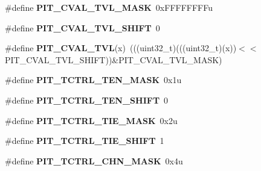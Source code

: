 \begin{DoxyCompactItemize}
\item 
\#define {\bfseries P\+I\+T\+\_\+\+C\+V\+A\+L\+\_\+\+T\+V\+L\+\_\+\+M\+A\+SK}~0x\+F\+F\+F\+F\+F\+F\+F\+Fu\hypertarget{group__PIT__Register__Masks_ga2810b877338372cb9b9d944b206c08d3}{}\label{group__PIT__Register__Masks_ga2810b877338372cb9b9d944b206c08d3}

\item 
\#define {\bfseries P\+I\+T\+\_\+\+C\+V\+A\+L\+\_\+\+T\+V\+L\+\_\+\+S\+H\+I\+FT}~0\hypertarget{group__PIT__Register__Masks_ga28753a1a45034ccd34e052faa3e02ff0}{}\label{group__PIT__Register__Masks_ga28753a1a45034ccd34e052faa3e02ff0}

\item 
\#define {\bfseries P\+I\+T\+\_\+\+C\+V\+A\+L\+\_\+\+T\+VL}(x)~(((uint32\+\_\+t)(((uint32\+\_\+t)(x))$<$$<$P\+I\+T\+\_\+\+C\+V\+A\+L\+\_\+\+T\+V\+L\+\_\+\+S\+H\+I\+FT))\&P\+I\+T\+\_\+\+C\+V\+A\+L\+\_\+\+T\+V\+L\+\_\+\+M\+A\+SK)\hypertarget{group__PIT__Register__Masks_ga00291ae8d045c0b0f199d8950c7e453a}{}\label{group__PIT__Register__Masks_ga00291ae8d045c0b0f199d8950c7e453a}

\item 
\#define {\bfseries P\+I\+T\+\_\+\+T\+C\+T\+R\+L\+\_\+\+T\+E\+N\+\_\+\+M\+A\+SK}~0x1u\hypertarget{group__PIT__Register__Masks_ga1099670711f996f5fa84e33bbfe794b2}{}\label{group__PIT__Register__Masks_ga1099670711f996f5fa84e33bbfe794b2}

\item 
\#define {\bfseries P\+I\+T\+\_\+\+T\+C\+T\+R\+L\+\_\+\+T\+E\+N\+\_\+\+S\+H\+I\+FT}~0\hypertarget{group__PIT__Register__Masks_ga0080137ff0378087f08cc12fd10b3e1f}{}\label{group__PIT__Register__Masks_ga0080137ff0378087f08cc12fd10b3e1f}

\item 
\#define {\bfseries P\+I\+T\+\_\+\+T\+C\+T\+R\+L\+\_\+\+T\+I\+E\+\_\+\+M\+A\+SK}~0x2u\hypertarget{group__PIT__Register__Masks_ga99639aabcac1d6042d14e7893d00bf67}{}\label{group__PIT__Register__Masks_ga99639aabcac1d6042d14e7893d00bf67}

\item 
\#define {\bfseries P\+I\+T\+\_\+\+T\+C\+T\+R\+L\+\_\+\+T\+I\+E\+\_\+\+S\+H\+I\+FT}~1\hypertarget{group__PIT__Register__Masks_gae21aee9e81741a924c9f2824fbc5775b}{}\label{group__PIT__Register__Masks_gae21aee9e81741a924c9f2824fbc5775b}

\item 
\#define {\bfseries P\+I\+T\+\_\+\+T\+C\+T\+R\+L\+\_\+\+C\+H\+N\+\_\+\+M\+A\+SK}~0x4u\hypertarget{group__PIT__Register__Masks_ga734e2e947c649d50b9ca46405e451c2b}{}\label{group__PIT__Register__Masks_ga734e2e947c649d50b9ca46405e451c2b}


\end{DoxyCompactItemize}
